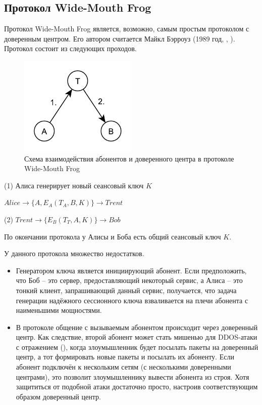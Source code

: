 \subsection{Протокол Wide-Mouth Frog}\label{section-protocols-wide-moth-frog}
Протокол Wide-Mouth Frog является, возможно, самым простым протоколом с доверенным центром. Его автором считается Майкл Бэрроуз (1989 год, , \cite{Burrows:Abadi:Needham:1990}). Протокол состоит из следующих проходов.

\begin{figure}
    \centering
    \includegraphics[width=0.5\textwidth]{pic/key_distribution-wide-mouth_frog}
    \caption{Схема взаимодействия абонентов и доверенного центра в протоколе Wide-Mouth Frog\label{fig:key_distribution-wide-mouth_frog}}
\end{figure}

\begin{protocol}
	\item[(1)] Алиса генерирует новый сеансовый ключ $K$
    \item[{}] $Alice \to \{ A, E_A \left( T_A, B, K \right) \} \to Trent$
	\item[(2)] $Trent \to \{ E_B \left( T_T, A, K \right) \} \to Bob$
\end{protocol}

По окончании протокола у Алисы и Боба есть общий сеансовый ключ $K$.

У данного протокола множество недостатков.

\begin{itemize}
	\item Генератором ключа является инициирующий абонент. Если предположить, что Боб -- это сервер, предоставляющий некоторый сервис, а Алиса -- это тонкий клиент, запрашивающий данный сервис, получается, что задача генерации надёжного сессионного ключа взваливается на плечи абонента с наименьшими мощностями.
	\item В протоколе общение с вызываемым абонентом происходит через доверенный центр. Как следствие, второй абонент может стать мишенью для DDOS-атаки с отражением (), когда злоумышленник будет посылать пакеты на доверенный центр, а тот формировать новые пакеты и посылать их абоненту. Если абонент подключён к нескольким сетям (с несколькими доверенными центрами), это позволит злоумышленнику вывести абонента из строя. Хотя защититься от подобной атаки достаточно просто, настроив соответствующим образом доверенный центр.
\end{itemize}

